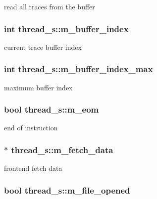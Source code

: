 \label{structthread__s_ac6b1743df3ea0beb279fcccf9a2833df}
read all traces from the buffer \hypertarget{structthread__s_a9aebcb5639f20227246a12fbfd1dbcc9}{
\subsubsection[{m\_\-buffer\_\-index}]{\setlength{\rightskip}{0pt plus 5cm}int {\bf thread\_\-s::m\_\-buffer\_\-index}}}
\label{structthread__s_a9aebcb5639f20227246a12fbfd1dbcc9}
current trace buffer index \hypertarget{structthread__s_a556880e1e2a0ae1fdb174a41bd94bc10}{
\subsubsection[{m\_\-buffer\_\-index\_\-max}]{\setlength{\rightskip}{0pt plus 5cm}int {\bf thread\_\-s::m\_\-buffer\_\-index\_\-max}}}
\label{structthread__s_a556880e1e2a0ae1fdb174a41bd94bc10}
maximum buffer index \hypertarget{structthread__s_a771e92a9ef2ecc972ccc647f3d2d4f3d}{
\subsubsection[{m\_\-eom}]{\setlength{\rightskip}{0pt plus 5cm}bool {\bf thread\_\-s::m\_\-eom}}}
\label{structthread__s_a771e92a9ef2ecc972ccc647f3d2d4f3d}
end of instruction \hypertarget{structthread__s_abf181f7d6a5596629a4237ab78b68497}{
\subsubsection[{m\_\-fetch\_\-data}]{$\ast$ {\bf thread\_\-s::m\_\-fetch\_\-data}}}
\label{structthread__s_abf181f7d6a5596629a4237ab78b68497}
frontend fetch data \hypertarget{structthread__s_a0cf104a3dce7ddb37a48cf8b713b4ac2}{
\subsubsection[{m\_\-file\_\-opened}]{\setlength{\rightskip}{0pt plus 5cm}bool {\bf thread\_\-s::m\_\-file\_\-opened}}}
